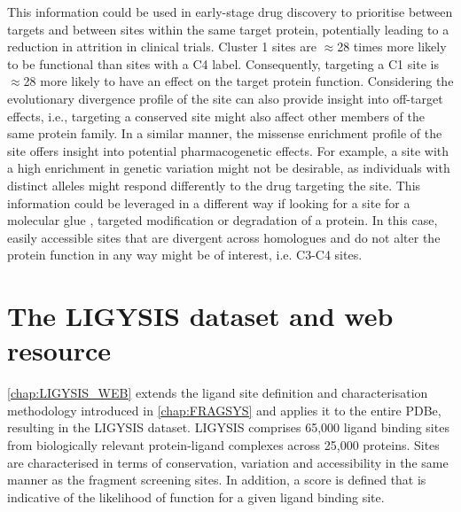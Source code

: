 
This information could be used in early-stage drug discovery to prioritise between targets and between sites within the same target protein, potentially leading to a reduction in attrition in clinical trials. Cluster 1 sites are $\approx$28 times more likely to be functional than sites with a C4 label. Consequently, targeting a C1 site is $\approx$28 more likely to have an effect on the target protein function. Considering the evolutionary divergence profile of the site can also provide insight into off-target effects, i.e., targeting a conserved site might also affect other members of the same protein family. In a similar manner, the missense enrichment profile of the site offers insight into potential pharmacogenetic effects. For example, a site with a high enrichment in genetic variation might not be desirable, as individuals with distinct alleles might respond differently to the drug targeting the site. This information could be leveraged in a different way if looking for a site for a molecular glue \cite{SCHREIBER_2021_GLUES}, targeted modification \cite{BREWER_2024_ATLAS, BREWER_2024_SMAD3, ZHAO_2024_TFEB} or degradation \cite{ZENGERLE_2015_BRD4, GADD_2017_PROTAC} of a protein. In this case, easily accessible sites that are divergent across homologues and do not alter the protein function in any way might be of interest, i.e. C3-C4 sites.

\section{The LIGYSIS dataset and web resource}

\autoref{chap:LIGYSIS_WEB} extends the ligand site definition and characterisation methodology introduced in \autoref{chap:FRAGSYS} and applies it to the entire PDBe, resulting in the LIGYSIS dataset. LIGYSIS comprises 65,000 ligand binding sites from biologically relevant protein-ligand complexes across 25,000 proteins. Sites are characterised in terms of conservation, variation and accessibility in the same manner as the fragment screening sites. In addition, a score is defined that is indicative of the likelihood of function for a given ligand binding site. %

